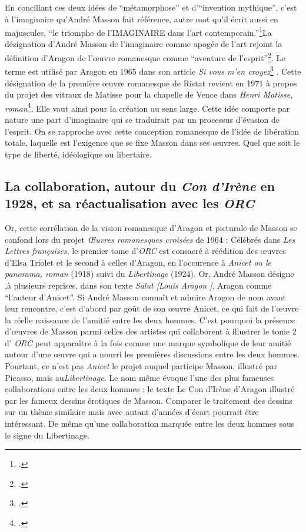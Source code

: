 En conciliant ces deux idées de \enquote{métamorphose} et d’\enquote{invention mythique}, c’est à l’imaginaire qu’André Masson fait référence, autre mot qu’il écrit aussi en majuscules, \enquote{le triomphe de l’IMAGINAIRE dans l’art contemporain.}\footcite[p19]{rebelle}La désignation d’André Masson de l’imaginaire comme apogée de l’art rejoint la définition d’Aragon de l’\oe{}uvre romanesque comme \enquote{aventure de l’esprit}\footcite{sivous}. Le terme est utilisé par Aragon en 1965 dans son article \emph{Si vous m'en croyez}\footcite[p1]{sivous} . Cette désignation de la première \oe{}uvre romanesque de Ristat revient en 1971 à propos du projet des vitraux de Matisse pour la chapelle de Vence dans \emph{Henri Matisse, roman}\footcite[p643]{aragonmatisse}. Elle vaut ainsi pour la création au sens large. Cette idée comporte par nature une part d’imaginaire qui se traduirait par un processus d’évasion de l’esprit. On se rapproche avec cette conception romanesque de l’idée de libération totale, laquelle est l’exigence que se fixe Masson dans ses \oe{}uvres. Quel que soit le type de liberté, idéologique ou libertaire. 

\subsection{La collaboration, autour du \textit{Con d'Irène} en 1928, et sa réactualisation avec les \textit{ORC}}

Or, cette corrélation de la vision romanesque d’Aragon et picturale de Masson se confond lors du projet \emph{\OE{}uvres romanesques croisées} de 1964 : Célébrés dans \emph{Les Lettres françaises}, le premier tome d’\emph{ORC} est consacré à réédition des \oe{}uvres d’Elsa Triolet et le second à celles d’Aragon, en l’occurence à \emph{Anicet ou le panorama, roman} (1918)  suivi du  \emph{Libertinage }(1924). Or, André Masson désigne ,à plusieurs reprises, dans son texte \emph{Salut [Louis Aragon ]}, Aragon comme \enquote{l’auteur d’Anicet}. Si André Masson connaît et admire Aragon de nom avant leur rencontre, c’est d’abord par goût de son \oe{}uvre Anicet, ce qui fait de l’\oe{}uvre la réelle naissance de l’amitié entre les deux hommes. C’est pourquoi la présence d’\oe{}uvres de Masson parmi celles des artistes qui collaborent à illustrer le tome 2 d’ \emph{ORC} peut apparaître à la fois comme une marque symbolique de leur amitié autour d’une \oe{}uvre qui a nourri les premières discussions entre les deux hommes. Pourtant, ce n’est pas \emph{Anicet} le projet auquel participe Masson, illustré par Picasso, mais au\emph{Libertinage}. Le nom même évoque l’une des plus fameuses collaborations entre les deux hommes : le texte Le Con d’Irène d’Aragon illustré par les fameux dessins érotiques de Masson. Comparer le traitement des dessins sur un thème similaire mais avec autant d’années d’écart pourrait être intéressant. De même qu’une collaboration marquée entre les deux hommes sous le signe du Libertinage. 

